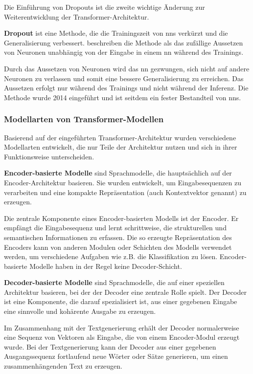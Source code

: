 Die Einführung von Dropouts ist die zweite wichtige Änderung zur Weiterentwicklung der Transformer-Architektur.
\begin{definition}\label{def:dropout}
    \textbf{Dropout} ist eine Methode, die die Trainingszeit von \ac{nn}s verkürzt und die Generalisierung verbessert.
    \citet{dropout} beschreiben die Methode als das zufällige Aussetzen von Neuronen unabhängig von der Eingabe in einem \ac{nn} während des Trainings.
\end{definition}
Durch das Aussetzen von Neuronen wird das \ac{nn} gezwungen, sich nicht auf andere Neuronen zu verlassen und somit eine bessere Generalisierung zu erreichen.
Das Aussetzen erfolgt nur während des Trainings und nicht während der Inferenz.
Die Methode wurde 2014 eingeführt und ist seitdem ein fester Bestandteil von \ac{nn}s.\\

\subsubsection{Modellarten von Transformer-Modellen}

Basierend auf der eingeführten Transformer-Architektur wurden verschiedene Modellarten entwickelt, die nur Teile der Architektur nutzen und sich in ihrer Funktionsweise unterscheiden.

\begin{definition}\label{def:encoder-basierte-modelle}
    \textbf{Encoder-basierte Modelle} sind Sprachmodelle, die hauptsächlich auf der Encoder-Architektur basieren.
    Sie wurden entwickelt, um Eingabesequenzen zu verarbeiten und eine kompakte Repräsentation (auch Kontextvektor genannt) zu erzeugen.
\end{definition}
Die zentrale Komponente eines Encoder-basierten Modells ist der Encoder.
Er empfängt die Eingabesequenz und lernt schrittweise, die strukturellen und semantischen Informationen zu erfassen.
Die so erzeugte Repräsentation des Encoders kann von anderen Modulen oder Schichten des Modells verwendet werden, um verschiedene Aufgaben
wie z.B. die Klassifikation zu lösen.
Encoder-basierte Modelle haben in der Regel keine Decoder-Schicht.\\

\begin{definition}\label{def:decoder-basierte-modelle}
    \textbf{Decoder-basierte Modelle} sind Sprachmodelle, die auf einer speziellen Architektur basieren, bei der der Decoder eine zentrale Rolle spielt.
    Der Decoder ist eine Komponente, die darauf spezialisiert ist, aus einer gegebenen Eingabe eine sinnvolle und kohärente Ausgabe zu erzeugen.
\end{definition}
Im Zusammenhang mit der Textgenerierung erhält der Decoder normalerweise eine Sequenz von Vektoren als Eingabe, die von einem Encoder-Modul erzeugt wurde.
Bei der Textgenerierung kann der Decoder aus einer gegebenen Ausgangssequenz fortlaufend neue Wörter oder Sätze generieren, um einen zusammenhängenden Text zu erzeugen.

